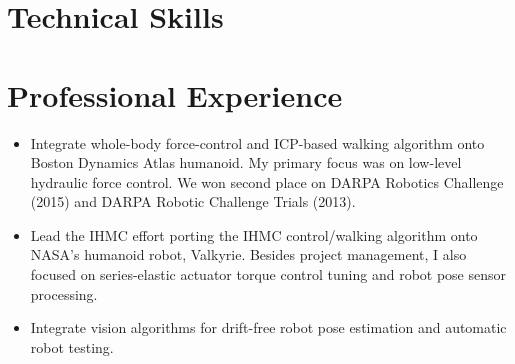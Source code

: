 \documentclass[11pt,letterpaper,sans]{moderncv}
\title{}
\begin{document}
\begin{CJK*}{UTF8}{bkai}
\makecvtitle
\end{CJK*}

\vspace{-10mm}


\section{Technical Skills}

	
\section{Professional Experience}
	{
	}
	
	{
		\begin{itemize}
		\item Integrate whole-body force-control and ICP-based walking algorithm onto Boston Dynamics Atlas humanoid. My primary focus was on 
			low-level hydraulic force control. We won second place on DARPA Robotics Challenge (2015) and DARPA Robotic Challenge Trials (2013).
		\item Lead the IHMC effort porting the IHMC control/walking algorithm onto NASA's humanoid robot, Valkyrie. Besides
		project management, I also focused on series-elastic actuator torque control tuning and robot pose sensor processing.
		\item Integrate vision algorithms for drift-free robot pose estimation and automatic robot testing.
		\end{itemize}
	}
	
\end{document}

